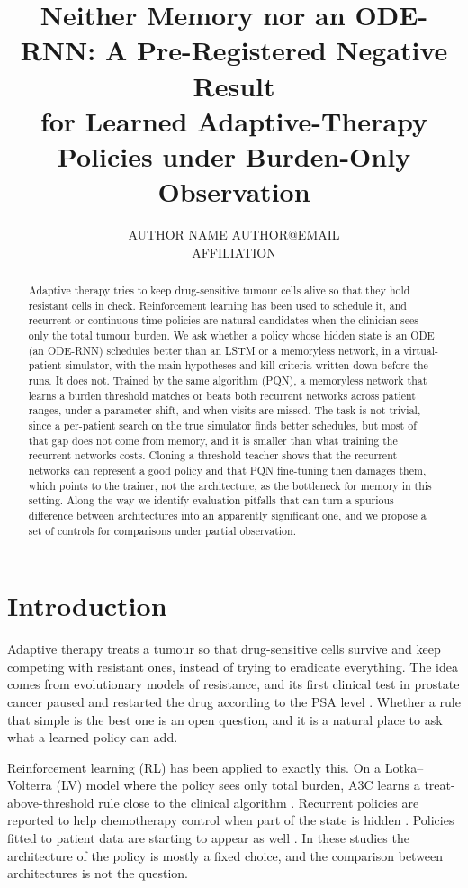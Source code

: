 \documentclass[10pt]{article}
\title{Neither Memory nor an ODE-RNN: A Pre-Registered Negative Result\\
for Learned Adaptive-Therapy Policies under Burden-Only Observation}
\author{\name AUTHOR NAME \email AUTHOR@EMAIL \\ \addr AFFILIATION}
\renewcommand{\cite}{\citep}
\begin{document}
\maketitle

\begin{abstract}
Adaptive therapy tries to keep drug-sensitive tumour cells alive so that they
hold resistant cells in check. Reinforcement learning has been used to schedule
it, and recurrent or continuous-time policies are natural candidates when the
clinician sees only the total tumour burden. We ask whether a policy whose
hidden state is an ODE (an ODE-RNN) schedules better than an LSTM or a
memoryless network, in a virtual-patient simulator, with the main hypotheses and
kill criteria written down before the runs. It does not. Trained by the same
algorithm (PQN), a memoryless network that learns a burden threshold matches or
beats both recurrent networks across patient ranges, under a parameter shift,
and when visits are missed. The task is not trivial, since a per-patient search
on the true simulator finds better schedules, but most of that gap does not
come from memory, and it is smaller than what training the recurrent networks
costs. Cloning a threshold teacher shows that the recurrent networks can
represent a good policy and that PQN fine-tuning then damages them, which
points to the trainer, not the architecture, as the bottleneck for memory in
this setting.
Along the way we identify evaluation pitfalls that can turn a spurious
difference between architectures into an apparently significant one, and we
propose a set of controls for comparisons under partial observation.
\end{abstract}

\section{Introduction}
Adaptive therapy treats a tumour so that drug-sensitive cells survive and keep
competing with resistant ones, instead of trying to eradicate everything. The
idea comes from evolutionary models of resistance, and its first clinical test
in prostate cancer paused and restarted the drug according to the PSA level
\cite{zhang2017}. Whether a rule that simple is the best one is an open
question, and it is a natural place to ask what a learned policy can add.

Reinforcement learning (RL) has been applied to exactly this. On a
Lotka--Volterra (LV) model where the policy sees only total burden, A3C learns a
treat-above-threshold rule close to the clinical algorithm \cite{gallagher2024}.
Recurrent policies are reported to help chemotherapy control when part of the
state is hidden \cite{kiram2026}. Policies fitted to patient data are starting
to appear as well \cite{lu2024}. In these studies the architecture of the policy
is mostly a fixed choice, and the comparison between architectures is not the
question.
\end{document}
